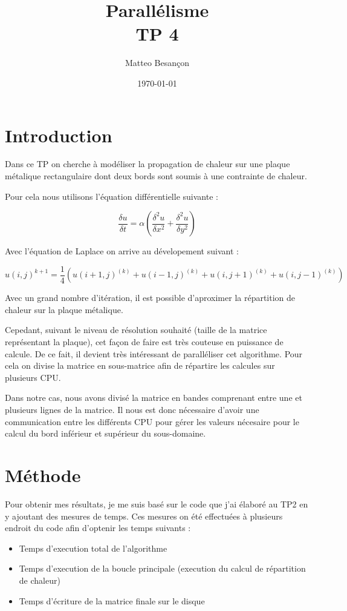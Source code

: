 \documentclass[12pt,a4paper,oneside, titlepage]{report}
\author{Matteo Besançon}
\title {Parallélisme \\ \large TP 4}
\date{\today}
\begin{document}
	\maketitle
	\newpage

	\section*{Introduction}
	Dans ce TP on cherche à modéliser la propagation de chaleur sur une plaque métalique rectangulaire dont deux bords sont soumis à une contrainte de chaleur.

	Pour cela nous utilisons l'équation différentielle suivante :

	$$\frac{\delta u}{\delta t} = \alpha (\frac{\delta^2 u}{\delta x^2} + \frac{\delta^2 u}{\delta y^2})$$

	Avec l'équation de Laplace on arrive au dévelopement suivant :

	$$u(i, j)^{k+1}=\frac{1}{4}(u(i+1, j)^{(k)}+ u(i-1, j)^{(k)} + u(i, j+1)^{(k)} + u(i, j-1)^{(k)})$$

	Avec un grand nombre d'itération, il est possible d'aproximer la répartition de chaleur sur la plaque métalique.

	Cepedant, suivant le niveau de résolution souhaité (taille de la matrice représentant la plaque), cet façon de faire est très couteuse en puissance de calcule.
	De ce fait, il devient très intéressant de paralléliser cet algorithme. Pour cela on divise la matrice en sous-matrice afin de répartire les calcules sur plusieurs CPU.

	Dans notre cas, nous avons divisé la matrice en bandes comprenant entre une et plusieurs lignes de la matrice.
	Il nous est donc nécessaire d'avoir une communication entre les différents CPU pour gérer les valeurs nécesaire pour le calcul du bord inférieur et supérieur du sous-domaine.

	\section*{Méthode}

	Pour obtenir mes résultats, je me suis basé sur le code que j'ai élaboré au TP2 en y ajoutant des mesures de temps.
	Ces mesures on été effectuées à plusieurs endroit du code afin d'optenir les temps suivants :

	\begin{itemize}
		\item Temps d'execution total de l'algorithme
		\item Temps d'execution de la boucle principale (execution du calcul de répartition de chaleur)
		\item Temps d'écriture de la matrice finale sur le disque
	\end{itemize}
\end{document}
